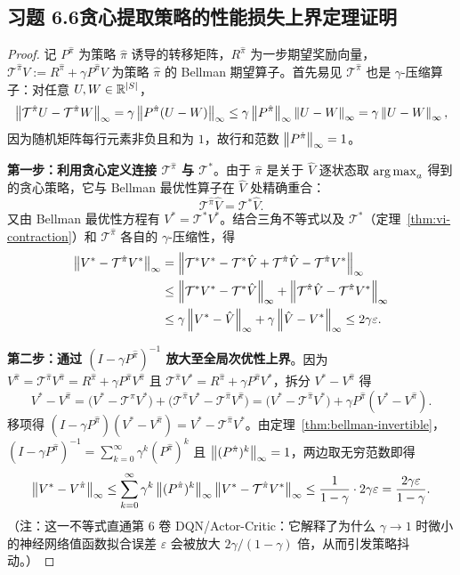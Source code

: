\subsection*{习题 6.6\quad 贪心提取策略的性能损失上界定理证明}
\begin{proof}
记 $P^{\hat{\pi}}$ 为策略 $\hat{\pi}$ 诱导的转移矩阵，$R^{\hat{\pi}}$ 为一步期望奖励向量，$\mathcal{T}^{\hat{\pi}} V := R^{\hat{\pi}} + \gamma P^{\hat{\pi}} V$ 为策略 $\hat{\pi}$ 的 Bellman 期望算子。首先易见 $\mathcal{T}^{\hat{\pi}}$ 也是 $\gamma$-压缩算子：对任意 $U, W \in \mathbb{R}^{|S|}$，
\[
  \left\|\mathcal{T}^{\hat{\pi}} U - \mathcal{T}^{\hat{\pi}} W\right\|_\infty = \gamma \left\|P^{\hat{\pi}}(U - W)\right\|_\infty \le \gamma \left\|P^{\hat{\pi}}\right\|_\infty \left\|U - W\right\|_\infty = \gamma \left\|U - W\right\|_\infty,
\]
因为随机矩阵每行元素非负且和为 $1$，故行和范数 $\left\|P^{\hat{\pi}}\right\|_\infty = 1$。

\textbf{第一步：利用贪心定义连接 $\mathcal{T}^{\hat{\pi}}$ 与 $\mathcal{T}^*$}。由于 $\hat{\pi}$ 是关于 $\hat{V}$ 逐状态取 $\operatorname*{arg\,max}_a$ 得到的贪心策略，它与 Bellman 最优性算子在 $\hat{V}$ 处精确重合：
\[
  \mathcal{T}^{\hat{\pi}} \hat{V} = \mathcal{T}^* \hat{V}.
\]
又由 Bellman 最优性方程有 $V^* = \mathcal{T}^* V^*$。结合三角不等式以及 $\mathcal{T}^*$（定理~\ref{thm:vi-contraction}）和 $\mathcal{T}^{\hat{\pi}}$ 各自的 $\gamma$-压缩性，得
\begin{align*}
  \left\|V^* - \mathcal{T}^{\hat{\pi}} V^*\right\|_\infty
  &= \left\|\mathcal{T}^* V^* - \mathcal{T}^* \hat{V} + \mathcal{T}^{\hat{\pi}} \hat{V} - \mathcal{T}^{\hat{\pi}} V^*\right\|_\infty \\
  &\le \left\|\mathcal{T}^* V^* - \mathcal{T}^* \hat{V}\right\|_\infty + \left\|\mathcal{T}^{\hat{\pi}} \hat{V} - \mathcal{T}^{\hat{\pi}} V^*\right\|_\infty \\
  &\le \gamma \left\|V^* - \hat{V}\right\|_\infty + \gamma \left\|\hat{V} - V^*\right\|_\infty
  \le 2\gamma \varepsilon.
\end{align*}

\textbf{第二步：通过 $(I - \gamma P^{\hat{\pi}})^{-1}$ 放大至全局次优性上界}。因为 $V^{\hat{\pi}} = \mathcal{T}^{\hat{\pi}} V^{\hat{\pi}} = R^{\hat{\pi}} + \gamma P^{\hat{\pi}} V^{\hat{\pi}}$ 且 $\mathcal{T}^{\hat{\pi}} V^* = R^{\hat{\pi}} + \gamma P^{\hat{\pi}} V^*$，拆分 $V^* - V^{\hat{\pi}}$ 得
\[
  V^* - V^{\hat{\pi}}
  = \big(V^* - \mathcal{T}^{\hat{\pi}} V^*\big) + \big(\mathcal{T}^{\hat{\pi}} V^* - \mathcal{T}^{\hat{\pi}} V^{\hat{\pi}}\big)
  = \big(V^* - \mathcal{T}^{\hat{\pi}} V^*\big) + \gamma P^{\hat{\pi}} (V^* - V^{\hat{\pi}}).
\]
移项得 $(I - \gamma P^{\hat{\pi}})(V^* - V^{\hat{\pi}}) = V^* - \mathcal{T}^{\hat{\pi}} V^*$。由定理~\ref{thm:bellman-invertible}，$(I - \gamma P^{\hat{\pi}})^{-1} = \sum_{k=0}^{\infty} \gamma^k (P^{\hat{\pi}})^k$ 且 $\left\|(P^{\hat{\pi}})^k\right\|_\infty = 1$，两边取无穷范数即得
\[
  \left\|V^* - V^{\hat{\pi}}\right\|_\infty
  \le \sum_{k=0}^{\infty} \gamma^k \left\|(P^{\hat{\pi}})^k\right\|_\infty \left\|V^* - \mathcal{T}^{\hat{\pi}} V^*\right\|_\infty
  \le \frac{1}{1 - \gamma} \cdot 2\gamma\varepsilon
  = \frac{2\gamma \varepsilon}{1 - \gamma}.
\]
（注：这一不等式直通第 6 卷 DQN/Actor-Critic：它解释了为什么 $\gamma \to 1$ 时微小的神经网络值函数拟合误差 $\varepsilon$ 会被放大 $2\gamma/(1-\gamma)$ 倍，从而引发策略抖动。）
\end{proof}

